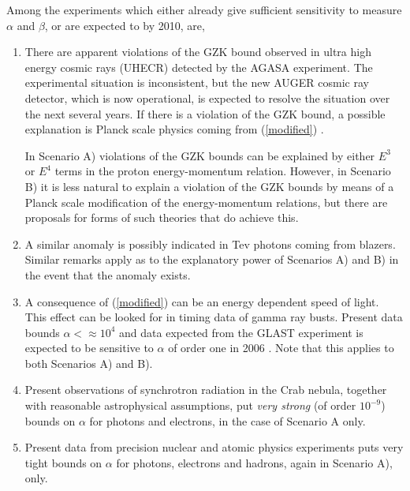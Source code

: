\documentclass[12pt]{article}
\begin{document}
Among the experiments which either already give sufficient
sensitivity to measure $\alpha$ and $\beta$, or are expected to by 2010,  are,
\begin{enumerate}

        \item{}There are apparent violations of the GZK bound
        observed in ultra high energy cosmic rays (UHECR) detected
        by the AGASA experiment\cite{AGASA}. The experimental situation is
        inconsistent, but the new AUGER cosmic ray detector, which
        is now operational, is expected to resolve the situation
        over the next several years. If there is a violation of the
        GZK bound, a possible explanation is Planck scale physics
        coming from (\ref{modified}) \cite{AC-Piron}.  
	
	In Scenario A) violations of
	the GZK bounds can be explained by either $E^{3}$ or
	$E^{4}$ terms in the proton energy-momentum relation.
	However, in Scenario B) it is less natural
	to explain a
	violation of the GZK bounds by means of a Planck scale
	modification of the energy-momentum relations, but there
	are proposals for forms of such theories that do achieve this. 

       \item{}A similar anomaly is possibly indicated in Tev
       photons coming from blazers\cite{blazers}.  Similar remarks
       apply as to the explanatory power of Scenarios A) and B) in the 
       event that the anomaly exists. 

        \item{}A consequence of (\ref{modified}) can be an energy
        dependent speed of light. This effect can be looked for in
        timing data of gamma ray busts. Present data bounds
        $\alpha < \approx 10^4$ \cite{wavelets} 
	and data expected  from the GLAST
        experiment is expected to be sensitive to $\alpha$ of
        order one in 2006 \cite{glast}. Note that this applies to both
	Scenarios A) and B). 

        \item{}Present observations of synchrotron radiation in the 
	Crab nebula, together with reasonable astrophysical assumptions,
	put {\it very strong} (of order $10^{-9}$)
        bounds on $\alpha$ for photons and electrons, in the case
        of Scenario A only\cite{synch}.

        \item{}Present data from precision nuclear and atomic
        physics experiments puts very tight bounds on $\alpha$ for
        photons, electrons and hadrons, again in Scenario A),
        only\cite{atomic}.


\end{enumerate}
\end{document}
